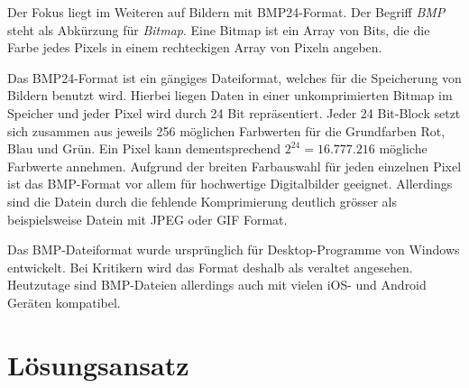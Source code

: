 \documentclass[course=erap]{aspdoc}
\begin{document}
Der Fokus liegt im Weiteren auf Bildern mit BMP24-Format. Der Begriff {\textit{BMP}} steht als Abkürzung für {\textit{Bitmap}}.
Eine Bitmap ist ein Array von Bits, die die Farbe jedes Pixels in einem rechteckigen Array von Pixeln angeben.\cite{q2} 

Das BMP24-Format ist ein gängiges Dateiformat, welches für die Speicherung von Bildern benutzt wird. Hierbei liegen Daten in einer unkomprimierten Bitmap im Speicher und jeder Pixel wird durch 24 Bit repräsentiert. Jeder 24 Bit-Block setzt sich zusammen aus jeweils 256 möglichen Farbwerten für die Grundfarben Rot, Blau und Grün. Ein Pixel kann dementsprechend \begin{math}2^{24} = 16.777.216 \end{math} mögliche Farbwerte annehmen. Aufgrund der breiten Farbauswahl für jeden einzelnen Pixel ist das BMP-Format vor allem für hochwertige Digitalbilder geeignet. Allerdings sind die Datein durch die fehlende Komprimierung deutlich grösser als beispielsweise Datein mit JPEG oder GIF Format. \cite{q1}

Das BMP-Dateiformat wurde ursprünglich für Desktop-Programme von Windows entwickelt. Bei Kritikern wird das Format deshalb als veraltet angesehen. Heutzutage sind BMP-Dateien allerdings auch mit vielen iOS- und Android Geräten kompatibel. 

\pagebreak

\section{Lösungsansatz}
\end{document}
